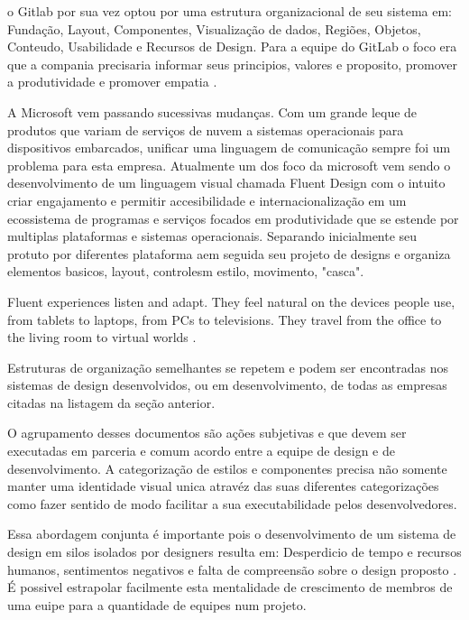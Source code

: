   o Gitlab por sua vez optou por uma estrutura organizacional de seu sistema em: Fundação, Layout, Componentes, Visualização de dados, Regiões, Objetos, Conteudo, Usabilidade e Recursos de Design. Para a equipe do GitLab o foco era que a compania precisaria informar seus principios, valores e proposito, promover a produtividade e promover empatia \cite{gitlab_design}.

  A Microsoft vem passando sucessivas mudanças. Com um grande leque de produtos que variam de serviços de nuvem a sistemas operacionais para dispositivos embarcados, unificar uma linguagem de comunicação sempre foi um problema para esta empresa. Atualmente um dos foco da microsoft vem sendo o desenvolvimento de um linguagem visual chamada Fluent Design com o intuito criar engajamento e permitir accesibilidade e internacionalização em um ecossistema de programas e serviços focados em produtividade que se estende por multiplas plataformas e sistemas operacionais. Separando inicialmente seu protuto por diferentes plataforma aem seguida seu projeto de designs e organiza elementos basicos, layout, controlesm estilo, movimento, "casca".

\begin{citacao}[brazil]
  Fluent experiences listen and adapt. They feel natural on the devices people use, from tablets to laptops, from PCs to televisions. They travel from the office to the living room to virtual worlds \cite{microsoft_fluent}.
\end{citacao}

  Estruturas de organização semelhantes se repetem e podem ser encontradas nos sistemas de design desenvolvidos, ou em desenvolvimento, de todas as empresas citadas na listagem da seção anterior.

  O agrupamento desses documentos são ações subjetivas e que devem ser executadas em parceria e comum acordo entre a equipe de design e de desenvolvimento. A categorização de estilos e componentes precisa não somente manter uma identidade visual unica atravéz das suas diferentes categorizações como fazer sentido de modo facilitar a sua executabilidade pelos desenvolvedores.

  Essa abordagem conjunta é importante pois o desenvolvimento de um sistema de design em silos isolados por designers resulta em: Desperdicio  de tempo e recursos humanos, sentimentos negativos e falta de compreensão sobre o design proposto \cite{GuilhermeGonzalez}. É possivel estrapolar facilmente esta mentalidade de crescimento de membros de uma euipe para a quantidade de equipes num projeto.


